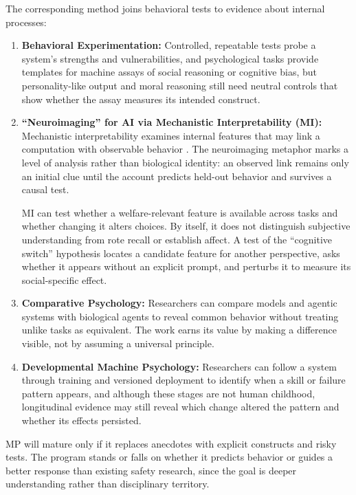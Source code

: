 \documentclass{article}
\begin{document}
The corresponding method joins behavioral tests to evidence about internal processes:
\begin{enumerate}
    \item \textbf{Behavioral Experimentation:} Controlled, repeatable tests probe a system's strengths and vulnerabilities, and psychological tasks provide templates for machine assays of social reasoning or cognitive bias, but personality-like output and moral reasoning still need neutral controls that show whether the assay measures its intended construct.
    \item \textbf{``Neuroimaging'' for AI via Mechanistic Interpretability (MI):} Mechanistic interpretability examines internal features that may link a computation with observable behavior \citep{ref35}. The neuroimaging metaphor marks a level of analysis rather than biological identity: an observed link remains only an initial clue until the account predicts held-out behavior and survives a causal test.
    
    MI can test whether a welfare-relevant feature is available across tasks and whether changing it alters choices. By itself, it does not distinguish subjective understanding from rote recall or establish affect. A test of the ``cognitive switch'' hypothesis locates a candidate feature for another perspective, asks whether it appears without an explicit prompt, and perturbs it to measure its social-specific effect.
    
    \item \textbf{Comparative Psychology:} Researchers can compare models and agentic systems with biological agents to reveal common behavior without treating unlike tasks as equivalent. The work earns its value by making a difference visible, not by assuming a universal principle.
    
    \item \textbf{Developmental Machine Psychology:} Researchers can follow a system through training and versioned deployment to identify when a skill or failure pattern appears, and although these stages are not human childhood, longitudinal evidence may still reveal which change altered the pattern and whether its effects persisted.
\end{enumerate}

MP will mature only if it replaces anecdotes with explicit constructs and risky tests. The program stands or falls on whether it predicts behavior or guides a better response than existing safety research, since the goal is deeper understanding rather than disciplinary territory.
\end{document}
